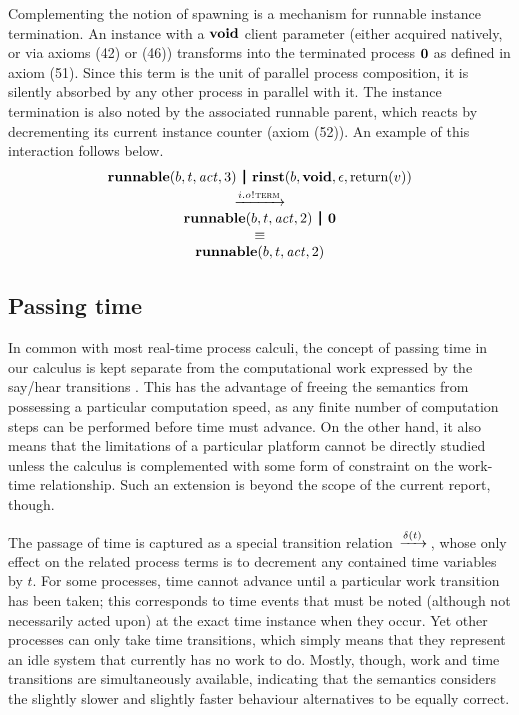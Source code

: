 \documentclass[10pt,conference]{IEEEtran}
\begin{document}
Complementing the notion of spawning is a mechanism for runnable instance termination. An instance with a $\textbf{void}$ client parameter (either acquired natively, or via axioms (42) or (46)) transforms into the terminated process $\textbf{0}$ as defined in axiom (51). Since this term is the unit of parallel process composition, it is silently absorbed by any other process in parallel with it. The instance termination is also noted by the associated runnable parent, which reacts by decrementing its current instance counter (axiom (52)). An example of this interaction follows below.
$$
\begin{array}{c}
  {\Trunnable b t \Act 3} \Opar
  {\Trinst b \Tvoid \Teps {\Treturn v}} \vspace{0.6ex} \\
  \red{\say{i.o}{\Tterm}} \\
  {\Trunnable b t \Act 2} \Opar \Tzero \\
  \equiv \\
  {\Trunnable b t \Act 2}
\end{array}
$$


\subsection{Passing time}

In common with most real-time process calculi, the concept of passing time in our calculus is kept separate from the computational work expressed by the say/hear transitions \cite{Baeten00processalgebra}. This has the advantage of freeing the semantics from possessing a particular computation speed, as any finite number of computation steps can be performed before time must advance. On the other hand, it also means that the  limitations of a particular platform cannot be directly studied unless the calculus is complemented with some form of constraint on the work-time relationship. Such an extension is beyond the scope of the current report, though.

The passage of time is captured as a special transition relation $\,\xrightarrow{\delta(t)}\,$, whose only effect on the related process terms is to decrement any contained time variables by $t$. For some processes, time cannot advance until a particular work transition has been taken; this corresponds to time events that must be noted (although not necessarily acted upon) at the exact time instance when they occur. Yet other processes can only take time transitions, which simply means that they represent an idle system that currently has no work to do. Mostly, though, work and time transitions are simultaneously available, indicating that the semantics considers the slightly slower and slightly faster behaviour alternatives to be equally correct.
\end{document}
